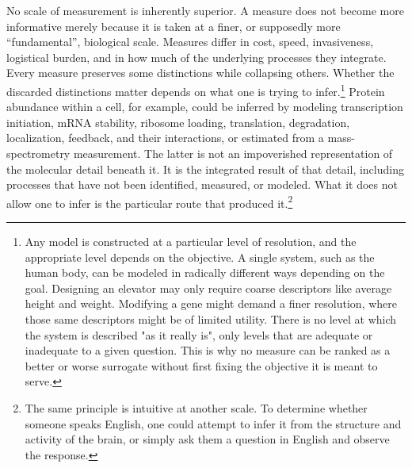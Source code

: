 \documentclass[twocolumn]{article} %
\begin{document}
No scale of measurement is inherently superior. A measure does not become more informative merely because it is taken at a finer, or supposedly more “fundamental”, biological scale. Measures differ in cost, speed, invasiveness, logistical burden, and in how much of the underlying processes they integrate. Every measure preserves some distinctions while collapsing others. Whether the discarded distinctions matter depends on what one is trying to infer.\footnote{Any model is constructed at a particular level of resolution, and the appropriate level depends on the objective. A single system, such as the human body, can be modeled in radically different ways depending on the goal. Designing an elevator may only require coarse descriptors like average height and weight. Modifying a gene might demand a finer resolution, where those same descriptors might be of limited utility. There is no level at which the system is described "as it really is", only levels that are adequate or inadequate to a given question. This is why no measure can be ranked as a better or worse surrogate without first fixing the objective it is meant to serve.} Protein abundance within a cell, for example, could be inferred by modeling transcription initiation, mRNA stability, ribosome loading, translation, degradation, localization, feedback, and their interactions, or estimated from a mass-spectrometry measurement. The latter is not an impoverished representation of the molecular detail beneath it. It is the integrated result of that detail, including processes that have not been identified, measured, or modeled. What it does not allow one to infer is the particular route that produced it.\footnote{The same principle is intuitive at another scale. To determine whether someone speaks English, one could attempt to infer it from the structure and activity of the brain, or simply ask them a question in English and observe the response.}
\end{document}
